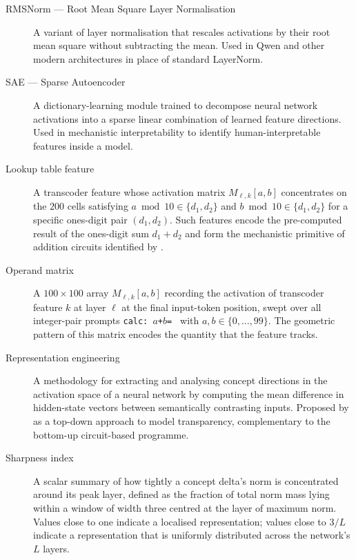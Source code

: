\begin{description}
  \item[RMSNorm --- Root Mean Square Layer Normalisation] A variant of layer normalisation
    that rescales activations by their root mean square without subtracting the mean.
    Used in Qwen and other modern architectures in place of standard LayerNorm.

  \item[SAE --- Sparse Autoencoder] A dictionary-learning module trained to decompose
    neural network activations into a sparse linear combination of learned feature directions.
    Used in mechanistic interpretability to identify human-interpretable features inside a model.

  \item[Lookup table feature] A transcoder feature whose activation matrix
    $M_{\ell,k}[a,b]$ concentrates on the $200$ cells satisfying
    $a \bmod 10 \in \{d_1, d_2\}$ and $b \bmod 10 \in \{d_1, d_2\}$ for a
    specific ones-digit pair $(d_1, d_2)$.
    Such features encode the pre-computed result of the ones-digit sum
    $d_1 + d_2$ and form the mechanistic primitive of addition circuits
    identified by \citet{lindsey2025biology}.

  \item[Operand matrix] A $100 \times 100$ array $M_{\ell,k}[a,b]$ recording the
    activation of transcoder feature $k$ at layer $\ell$ at the final input-token
    position, swept over all integer-pair prompts \texttt{calc:~$a$+$b$=~} with
    $a, b \in \{0, \ldots, 99\}$.
    The geometric pattern of this matrix encodes the quantity that the feature tracks.

  \item[Representation engineering] A methodology for extracting and analysing concept
    directions in the activation space of a neural network by computing the mean difference
    in hidden-state vectors between semantically contrasting inputs.
    Proposed by \citet{zou2023representation} as a top-down approach to model transparency,
    complementary to the bottom-up circuit-based programme.

  \item[Sharpness index] A scalar summary of how tightly a concept delta's norm is concentrated
    around its peak layer, defined as the fraction of total norm mass lying within a window of
    width three centred at the layer of maximum norm.
    Values close to one indicate a localised representation; values close to $3/L$ indicate
    a representation that is uniformly distributed across the network's $L$ layers.



\end{description}
